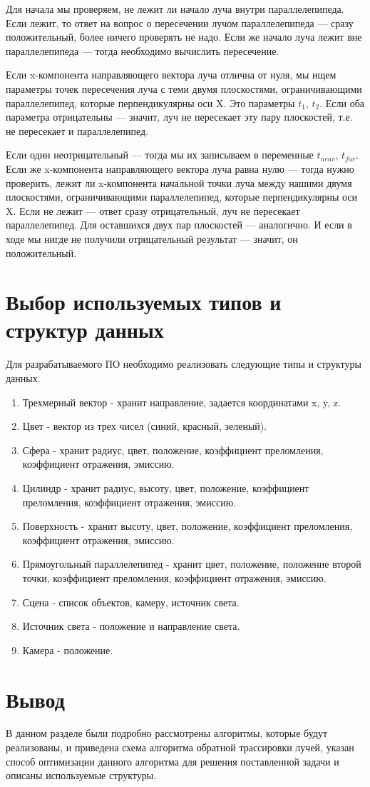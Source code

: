 Для начала мы проверяем, не лежит ли начало луча внутри параллелепипеда. Если лежит, то ответ на вопрос о пересечении лучом параллелепипеда --- сразу положительный, более ничего проверять не надо. 
Если же начало луча лежит вне параллелепипеда --- тогда необходимо вычислить пересечение.

Если x-компонента направляющего вектора луча отлична от нуля, мы ищем параметры точек пересечения луча с теми двумя плоскостями, ограничивающими параллелепипед, которые перпендикулярны оси X. Это параметры $t_1$, $t_2$. 
Если оба параметра отрицательны --- значит, луч не пересекает эту пару плоскостей, т.е. не пересекает и параллелепипед. 

Если один неотрицательный --- тогда мы их записываем в переменные $t_{near}$, $t_{far}$. Если же x-компонента направляющего вектора луча равна нулю --- тогда нужно проверить, лежит ли x-компонента начальной точки луча между нашими двумя плоскостями, ограничивающими параллелепипед, которые перпендикулярны оси X. 
Если не лежит --- ответ сразу отрицательный, луч не пересекает параллелепипед. Для оставшихся двух пар плоскостей --- аналогично. И если в ходе мы нигде не получили отрицательный результат --- значит, он положительный.

\section{Выбор используемых типов и структур данных} 

Для разрабатываемого ПО необходимо реализовать следующие типы и структуры данных.
\begin{enumerate}
	
	\item Трехмерный вектор - хранит направление, задается координатами x, y, z.
	
	\item Цвет - вектор из трех чисел (синий, красный, зеленый).
	\item Сфера - хранит радиус, цвет, положение, коэффициент преломления, коэффициент отражения, эмиссию.
	\item Цилиндр - хранит радиус, высоту, цвет, положение, коэффициент преломления, коэффициент отражения, эмиссию.
	\item Поверхность - хранит высоту, цвет, положение, коэффициент преломления, коэффициент отражения, эмиссию.
	\item Прямоугольный параллелепипед - хранит цвет, положение, положение второй точки, коэффициент преломления, коэффициент отражения, эмиссию.
	\item Сцена - список объектов, камеру, источник света.
	\item Источник света - положение и направление света.
	\item Камера - положение.
	
\end{enumerate}


\section{Вывод}
В данном разделе были подробно рассмотрены алгоритмы, которые будут реализованы, и приведена схема алгоритма обратной трассировки лучей, указан способ оптимизации данного алгоритма для решения поставленной задачи и описаны используемые структуры.